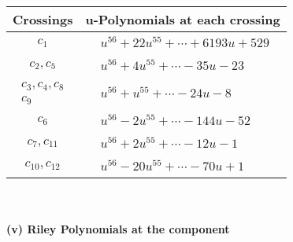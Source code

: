 \documentclass[1p]{elsarticle_modified}
\theoremstyle{definition}
\begin{document}
\begin{tabular}{m{50pt}|m{274pt}}
Crossings & \hspace{64pt}u-Polynomials at each crossing \\
\hline $$\begin{aligned}c_{1}\end{aligned}$$&$\begin{aligned}
&u^{56}+22 u^{55}+\cdots+6193 u+529
\end{aligned}$\\
\hline $$\begin{aligned}c_{2},c_{5}\end{aligned}$$&$\begin{aligned}
&u^{56}+4 u^{55}+\cdots-35 u-23
\end{aligned}$\\
\hline $$\begin{aligned}c_{3},c_{4},c_{8}\\c_{9}\end{aligned}$$&$\begin{aligned}
&u^{56}+u^{55}+\cdots-24 u-8
\end{aligned}$\\
\hline $$\begin{aligned}c_{6}\end{aligned}$$&$\begin{aligned}
&u^{56}-2 u^{55}+\cdots-144 u-52
\end{aligned}$\\
\hline $$\begin{aligned}c_{7},c_{11}\end{aligned}$$&$\begin{aligned}
&u^{56}+2 u^{55}+\cdots-12 u-1
\end{aligned}$\\
\hline $$\begin{aligned}c_{10},c_{12}\end{aligned}$$&$\begin{aligned}
&u^{56}-20 u^{55}+\cdots-70 u+1
\end{aligned}$\\
\hline
\end{tabular}\\~\\
\newpage\renewcommand{\arraystretch}{1}
\flushleft \textbf{(v) Riley Polynomials at the component}\newline \\
\end{document}
